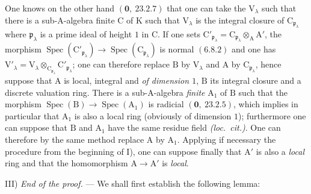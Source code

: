 One knows on the other hand $(\mathbf{0},~23.2.7)$ that one can take the $\mathrm{V}_\lambda$ such that there is a
sub-$\mathrm{A}$-algebra finite $\mathrm{C}$ of $\mathrm{K}$ such that $\mathrm{V}_\lambda$ is the integral closure of $\mathrm{C}_{\mathfrak{p}_\lambda}$ where $\mathfrak{p}_\lambda$ is a
prime ideal of height $1$ in $\mathrm{C}$. If one sets $\mathrm{C}'_{\mathfrak{p}_\lambda}=\mathrm{C}_{\mathfrak{p}_\lambda}\otimes_\mathrm{A}\mathrm{A}'$, the morphism
$\operatorname{Spec}(\mathrm{C}'_{\mathfrak{p}_\lambda})\to\operatorname{Spec}(\mathrm{C}_{\mathfrak{p}_\lambda})$ is normal $(6.8.2)$ and one has $\mathrm{V}'_\lambda=\mathrm{V}_\lambda\otimes_{\mathrm{C}_{\mathfrak{p}_\lambda}}\mathrm{C}'_{\mathfrak{p}_\lambda}$; one can therefore
replace $\mathrm{B}$ by $\mathrm{V}_\lambda$ and $\mathrm{A}$ by $\mathrm{C}_{\mathfrak{p}_\lambda}$, hence suppose that $\mathrm{A}$ is local, integral and \emph{of dimension $1$},
$\mathrm{B}$ its integral closure and a discrete valuation ring. There is a sub-$\mathrm{A}$-algebra \emph{finite} $\mathrm{A}_1$
of $\mathrm{B}$ such that the morphism $\operatorname{Spec}(\mathrm{B})\to\operatorname{Spec}(\mathrm{A}_1)$ is radicial $(\mathbf{0},~23.2.5)$, which implies
in particular that $\mathrm{A}_1$ is also a local ring (obviously of dimension $1$); furthermore
one can suppose that $\mathrm{B}$ and $\mathrm{A}_1$ have the same residue field \emph{(loc.~cit.)}. One can therefore by the
same method replace $\mathrm{A}$ by $\mathrm{A}_1$. Applying if necessary the procedure from the beginning of I),
one can suppose finally that $\mathrm{A}'$ is also a \emph{local} ring and that the homomorphism
$\mathrm{A}\to\mathrm{A}'$ is \emph{local}.

III) \emph{End of the proof.} --- We shall first establish the following lemma:

